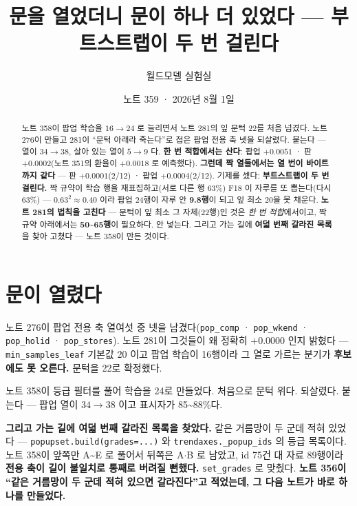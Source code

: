 \documentclass[11pt]{article}
\begin{document}
\title{문을 열었더니 문이 하나 더 있었다 --- 부트스트랩이 두 번 걸린다}
\author{월드모델 실험실}
\date{노트 359 · 2026년 8월 1일}
\maketitle

\begin{abstract}
노트 358이 팝업 학습을 $16 \to 24$ 로 늘리면서 노트 281의 잎 문턱 22를
처음 넘겼다. 노트 276이 만들고 281이 ``문턱 아래라 죽는다''로 접은 팝업
전용 축 넷을 되살렸다. 붙는다 --- 열이 $34 \to 38$, 살아 있는 열이
$5 \to 9$ 다. \textbf{한 번 적합에서는 산다}: 팝업 $+0.0051$ · 판
$+0.0002$(노트 351의 환율이 $+0.0018$ 로 예측했다). \textbf{그런데 짝
열둘에서는 열 번이 바이트까지 같다} --- 판 $+0.0001$(2/12) · 팝업
$+0.0004$(2/12). 기제를 셌다: \textbf{부트스트랩이 두 번 걸린다.} 짝
규약이 학습 행을 재표집하고(서로 다른 행 63\%) F18 이 자루를 또
뽑는다(다시 63\%) --- $0.63^2 \approx 0.40$ 이라 팝업 24행이 자루 안
\textbf{9.8행}이 되고 잎 최소 20을 못 채운다. \textbf{노트 281의 법칙을
고친다} --- 문턱이 잎 최소 그 자체(22행)인 것은 \emph{한 번 적합}에서이고,
짝 규약 아래에서는 \textbf{50\textasciitilde{}65행}이 필요하다.
안 넣는다. 그리고 가는 길에 \textbf{여덟 번째 갈라진 목록}을 찾아 고쳤다 ---
노트 358이 만든 것이다.
\end{abstract}

\section{문이 열렸다}

노트 276이 팝업 전용 축 열여섯 중 넷을 남겼다(\texttt{pop\_comp} ·
\texttt{pop\_wkend} · \texttt{pop\_holid} · \texttt{pop\_stores}). 노트
281이 그것들이 왜 정확히 $+0.0000$ 인지 밝혔다 ---
\texttt{min\_samples\_leaf} 기본값 20 이고 팝업 학습이 16행이라 그 열로
가르는 분기가 \textbf{후보에도 못 오른다.} 문턱을 22로 확정했다.

노트 358이 등급 필터를 풀어 학습을 24로 만들었다. 처음으로 문턱 위다.
되살렸다. 붙는다 --- 팝업 열이 $34 \to 38$ 이고 표시자가 85\textasciitilde{}88\%다.

\textbf{그리고 가는 길에 여덟 번째 갈라진 목록을 찾았다.} 같은 거름망이
두 군데 적혀 있었다 --- \texttt{popupset.build(grades=...)} 와
\texttt{trendaxes.\_popup\_ids} 의 등급 목록이다. 노트 358이 앞쪽만
A\textasciitilde{}E 로 풀어서 뒤쪽은 A$\cdot$B 로 남았고, id 75건 대 자료
89행이라 \textbf{전용 축이 길이 불일치로 통째로 버려질 뻔했다.}
\texttt{set\_grades} 로 맞췄다. \textbf{노트 356이 ``같은 거름망이 두
군데 적혀 있으면 갈라진다''고 적었는데, 그 다음 노트가 바로 하나를
만들었다.}
\end{document}
